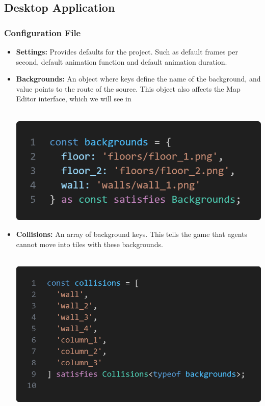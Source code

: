 \documentclass{article}
\begin{document}
\subsection{Desktop Application}
\subsubsection{Configuration File}

\begin{itemize}
    \item \textbf{Settings:} Provides defaults for the project. Such as default frames per second, default animation function and default animation duration.
    \item \textbf{Backgrounds:} An object where keys define the name of the background, and value points to the route of the source. This object also affects the Map Editor interface, which we will see in \\\\
    \begin{minipage}{\linewidth}
        \centering
        \includegraphics[width=1\textwidth]{backgrounds.png}
        \label{fig:figure1}
    \end{minipage}

    \item \textbf{Collisions:} An array of background keys. This tells the game that agents cannot move into tiles with these backgrounds.\\\\
    \begin{minipage}{\linewidth}
        \centering
        \includegraphics[width=1\textwidth]{collisions.png}
        \label{fig:figure2}
    \end{minipage}
    

\end{itemize}
\end{document}
